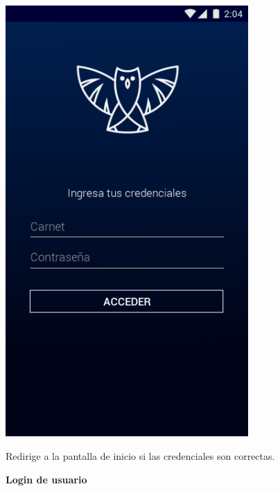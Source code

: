 \documentclass[12pt]{article}
\begin{document}
\begin{figure}[t]
	\begin{minipage}[t]{0.45\textwidth}
		\centering
		\caption{\textbf{Login de usuario}}
		\includegraphics[width=0.825\textwidth]{img/1.png}	
	\end{minipage}\hfill
	\begin{minipage}[t]{0.45\textwidth}
		\vspace*{10mm}
		Redirige a la pantalla de inicio si las credenciales son correctas.
	\end{minipage}



\end{figure}
\end{document}
